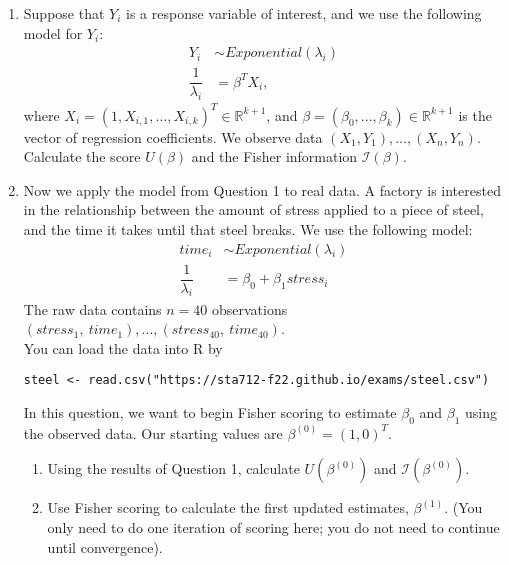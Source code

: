 \documentclass[11pt]{article}
\begin{document}
\begin{enumerate}
\item Suppose that $Y_i$ is a response variable of interest, and we use the following model for $Y_i$:
\begin{align*}
Y_i &\sim Exponential(\lambda_i) \\
\dfrac{1}{\lambda_i} &= \beta^T X_i,
\end{align*}
where $X_i = (1, X_{i,1},...,X_{i,k})^T \in \mathbb{R}^{k+1}$, and $\beta = (\beta_0, ..., \beta_k) \in \mathbb{R}^{k+1}$ is the vector of regression coefficients. We observe data $(X_1, Y_1),...,(X_n, Y_n)$.\\

Calculate the score $U(\beta)$ and the Fisher information $\mathcal{I}(\beta)$.

\item Now we apply the model from Question 1 to real data. A factory is interested in the relationship between the amount of stress applied to a piece of steel, and the time it takes until that steel breaks. We use the following model:
\begin{align*}
time_i &\sim Exponential(\lambda_i) \\
\dfrac{1}{\lambda_i} &= \beta_0 + \beta_1 stress_i
\end{align*}
The raw data contains $n = 40$ observations $(stress_1, \ time_1),...,(stress_{40}, \ time_{40})$.\\

\noindent You can load the data into R by
\begin{verbatim}
steel <- read.csv("https://sta712-f22.github.io/exams/steel.csv")
\end{verbatim}

In this question, we want to begin Fisher scoring to estimate $\beta_0$ and $\beta_1$ using the observed data. Our starting values are $\beta^{(0)} = (1, 0)^T$.

\begin{enumerate}
\item Using the results of Question 1, calculate $U(\beta^{(0)})$ and $\mathcal{I}(\beta^{(0)})$.

\item Use Fisher scoring to calculate the first updated estimates, $\beta^{(1)}$. (You only need to do one iteration of scoring here; you do not need to continue until convergence).
\end{enumerate}

\end{enumerate}
\end{document}
